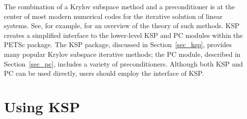 The combination of a Krylov subspace method and a preconditioner is at
the center of most modern numerical codes for the iterative solution of
linear systems.  See, for example, \cite{fgn} for an overview of the theory
of such methods.  KSP creates a simplified interface to the
lower-level KSP and PC modules within the PETSc package.  The KSP package,
discussed in
Section~\ref{sec_ksp}, provides many popular Krylov
 subspace iterative methods;
the PC module, described in Section~\ref{sec_pc}, includes a
variety of preconditioners.  Although both  KSP and PC can be used
directly, users should employ the interface of KSP.

\section{Using KSP} 
\label{sec_usingsles}

